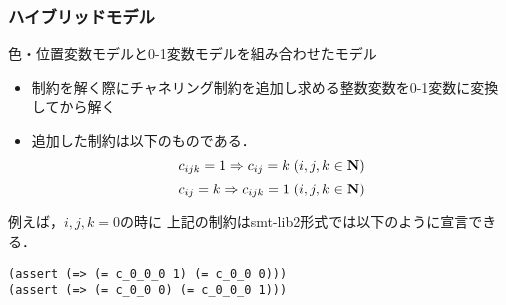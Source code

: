 \begin{frame}[fragile]\small
    \frametitle{ハイブリッドモデル}
    色・位置変数モデルと0-1変数モデルを組み合わせたモデル\\
    \setlength{\abovedisplayskip}{1pt} %
    \setlength{\belowdisplayskip}{1pt} %
    \begin{block}{}
        \begin{itemize}
            \item \distinct 制約を解く際にチャネリング制約を追加し求める整数変数を0-1変数に変換してから解く
            \item 追加した制約は以下のものである．
                $$ c_{ijk}=1 \Rightarrow c_{ij}=k \; (i,j,k \in \bf N)$$
                $$ c_{ij}=k \Rightarrow c_{ijk}=1 \; (i,j,k \in \bf N)$$
        \end{itemize}
    \end{block}
    例えば，$i,j,k=0$の時に
    上記の制約はsmt-lib2形式では以下のように宣言できる．
    \begin{exampleblock}{}
\begin{verbatim}
(assert (=> (= c_0_0_0 1) (= c_0_0 0)))
(assert (=> (= c_0_0 0) (= c_0_0_0 1)))
\end{verbatim}
    \end{exampleblock}
\end{frame}




